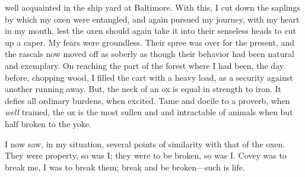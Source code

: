 {\protect\hypertarget{212}{}{}}well acquainted in the ship yard at
Baltimore. With this, I cut down the saplings by which my oxen were
entangled, and again pursued my journey, with my heart in my mouth, lest
the oxen should again take it into their senseless heads to cut up a
caper. My fears were groundless. Their spree was over for the present,
and the rascals now moved off as soberly as though their behavior had
been natural and exemplary. On reaching the part of the forest where I
had been, the day before, chopping wood, I filled the cart with a heavy
load, as a security against another running away. But, the neck of an ox
is equal in strength to iron. It defies all ordinary burdens, when
excited. Tame and docile to a proverb, when \emph{well} trained, the ox
is the most sullen and and intractable of animals when but half broken
to the yoke.

I now saw, in my situation, several points of similarity with that of
the oxen. They were property, so was I; they were to be broken, so was
I. Covey was to break me, I was to break them; break and be
broken---such is life.

